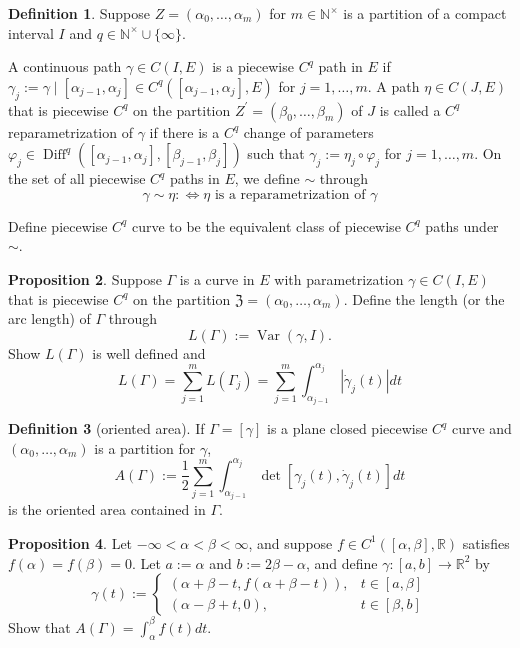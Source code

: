 \documentclass[12pt,a4paper]{book}
\theoremstyle{definition}
\newtheorem{defn}{Definition}[section]
\newtheorem{prop}[defn]{Proposition}
\begin{document}
\begin{defn}
    Suppose $Z=\left(\alpha_0, \ldots, \alpha_m\right)$ for $m \in \mathbb{N}^{\times}$
    is a partition of a compact interval $I$ and 
    $q \in \mathbb{N}^{\times} \cup\{\infty\}$.
    
    A continuous path $\gamma \in C(I, E)$ is a piecewise $C^q$ path in $E$ 
    if 
    $\gamma_j:=\gamma \mid\left[\alpha_{j-1}, \alpha_j\right] \in C^q\left(\left[\alpha_{j-1}, \alpha_j\right], E\right)$ for $j=1, \ldots, m$. 
    A path $\eta \in C(J, E)$ that is piecewise $C^q$ on the partition 
    $Z^{\prime}=\left(\beta_0, \ldots, \beta_m\right)$ of $J$ is called a $C^q$ reparametrization of $\gamma$ if there is a $C^q$ change of parameters $\varphi_j \in \operatorname{Diff}^q\left(\left[\alpha_{j-1}, \alpha_j\right],\left[\beta_{j-1}, \beta_j\right]\right)$ 
    such that $\gamma_j:=\eta_j \circ \varphi_j$ for $j=1, \ldots, m$. On the set of all piecewise $C^q$ paths in $E$, we define $\sim$ through
    $$
    \gamma \sim \eta: \Leftrightarrow \eta \text { is a reparametrization of } \gamma
    $$

    Define piecewise $C^q$ curve to be 
    the equivalent class of piecewise $C^q$ paths under $\sim$. 

\end{defn}
\begin{prop}
    Suppose $\Gamma$ is a curve in $E$ with parametrization $\gamma \in C(I, E)$ that is piecewise $C^q$ on the partition $\mathfrak{Z}=\left(\alpha_0, \ldots, \alpha_m\right)$. Define the length (or the arc length) of $\Gamma$ through
    $$
    L(\Gamma):=\operatorname{Var}(\gamma, I) .
    $$
    Show $L(\Gamma)$ is well defined and
    $$
    L(\Gamma)=\sum_{j=1}^m L\left(\Gamma_j\right)=\sum_{j=1}^m \int_{\alpha_{j-1}}^{\alpha_j}\left|\dot{\gamma}_j(t)\right| d t
    $$
\end{prop}
\begin{defn}[oriented area]
If $\Gamma=[\gamma]$ is a plane closed piecewise $C^q$ curve and $\left(\alpha_0, \ldots, \alpha_m\right)$ is a partition for $\gamma$,
$$
A(\Gamma):=\frac{1}{2} \sum_{j=1}^m \int_{\alpha_{j-1}}^{\alpha_j} \operatorname{det}\left[\gamma_j(t), \dot{\gamma}_j(t)\right] d t
$$
is the oriented area contained in $\Gamma$.
\end{defn}
\begin{prop}
    Let $-\infty<\alpha<\beta<\infty$, and suppose $f \in C^1([\alpha, \beta], \mathbb{R})$ satisfies $f(\alpha)=f(\beta)=0$. Let $a:=\alpha$ and $b:=2 \beta-\alpha$, and define $\gamma:[a, b] \rightarrow \mathbb{R}^2$ by
    $$
    \gamma(t):= \begin{cases}(\alpha+\beta-t, f(\alpha+\beta-t)), & t \in[a, \beta] \\ (\alpha-\beta+t, 0), & t \in[\beta, b]\end{cases}
    $$
    Show that
    $A(\Gamma)=\int_\alpha^\beta f(t) d t$.

\end{prop}
\end{document}
